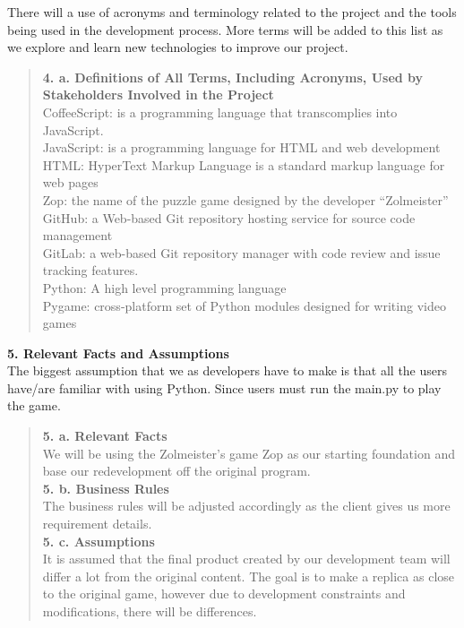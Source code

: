 \documentclass[12pt]{article}
\begin{document}
There will a use of acronyms and terminology related to the project and the tools being used in the development process. More terms will be added to this list as we explore and learn new technologies to improve our project. 
\begin{quote}
\textbf{4. a. Definitions of All Terms, Including Acronyms, Used by Stakeholders Involved in the Project}\\
CoffeeScript: is a programming language that transcomplies into JavaScript.\\
JavaScript: is a programming language for HTML and web development\\
HTML: HyperText Markup Language is a standard markup language for web pages\\
Zop: the name of the puzzle game designed by the developer “Zolmeister”\\
GitHub: a Web-based Git repository hosting service for source code management\\
GitLab: a web-based Git repository manager with code review and issue tracking features.\\
Python: A high level programming language\\
Pygame: cross-platform set of Python modules designed for writing video games\\

\end{quote}
\textbf{5. Relevant Facts and Assumptions}\\
The biggest assumption that we as developers have to make is that all the users have/are familiar with using Python. Since users must run the main.py to play the game.
\begin{quote}
\textbf{5. a. Relevant Facts}\\
We will be using the Zolmeister’s game Zop as our starting foundation and base our redevelopment off the original program.\\
\textbf{5. b. Business Rules}\\
The business rules will be adjusted accordingly as the client gives us more requirement details. \\
\textbf{5. c. Assumptions}\\
It is assumed that the final product created by our development team will differ a lot from the original content. The goal is to make a replica as close to the original game, however due to development constraints and modifications, there will be differences. \\
\end{quote}
\end{document}
